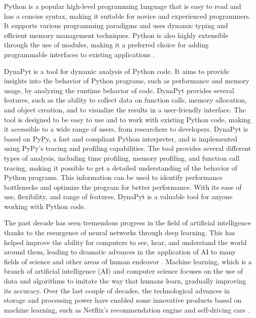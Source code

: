 Python is a popular high-level programming language that is easy to read and has a concise syntax, making it suitable for novice and experienced programmers. It supports various programming paradigms and uses dynamic typing and efficient memory management techniques. Python is also highly extensible through the use of modules, making it a preferred choice for adding programmable interfaces to existing applications \cite{Python_language_wiki}.

DynaPyt is a tool for dynamic analysis of Python code. It aims to provide insights into the behavior of Python programs, such as performance and memory usage, by analyzing the runtime behavior of code. DynaPyt provides several features, such as the ability to collect data on function calls, memory allocation, and object creation, and to visualize the results in a user-friendly interface. The tool is designed to be easy to use and to work with existing Python code, making it accessible to a wide range of users, from researchers to developers. DynaPyt is based on PyPy, a fast and compliant Python interpreter, and is implemented using PyPy's tracing and profiling capabilities. The tool provides several different types of analysis, including time profiling, memory profiling, and function call tracing, making it possible to get a detailed understanding of the behavior of Python programs. This information can be used to identify performance bottlenecks and optimize the program for better performance.  With its ease of use, flexibility, and range of features, DynaPyt is a valuable tool for anyone working with Python code. \cite{DynaPyt2022}

The past decade has seen tremendous progress in the field of artificial intelligence thanks to the resurgence of neural networks through deep learning. This has helped improve the ability for computers to see, hear, and understand the world around them, leading to dramatic advances in the application of AI to many fields of science and other areas of human endeavor \cite{Machine_Learning_decade}. Machine learning, which is a branch of artificial intelligence (AI) and computer science focuses on the use of data and algorithms to imitate the way that humans learn, gradually improving its accuracy. Over the last couple of decades, the technological advances in storage and processing power have enabled some innovative products based on machine learning, such as Netflix’s recommendation engine and self-driving cars \cite{Machine_Learning}.

